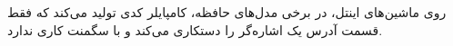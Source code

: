 \section{}
\paragraph{}\label{hint:231}
روی ماشین‌های اینتل، در برخی مدل‌های حافظه، کامپایلر کدی تولید می‌کند که فقط قسمت آدرس یک اشاره‌گر را دستکاری می‌کند و با سگمنت کاری ندارد.